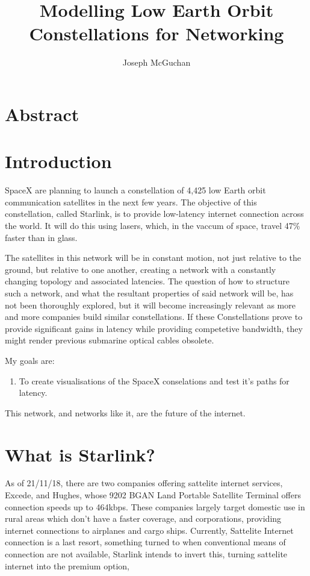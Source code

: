 \documentclass[12pt]{article}
\begin{document}
\title{Modelling Low Earth Orbit Constellations for Networking}
\author{Joseph McGuchan}
\maketitle
\thispagestyle{empty}

\section{Abstract}


\section{Introduction}

SpaceX are planning to launch a constellation of 4,425 low Earth orbit communication satellites in the next few years. The objective of this constellation, called Starlink, is to provide low-latency internet connection across the world. It will do this using lasers, which, in the vaccum of space, travel 47\% faster than in glass.

The satellites in this network will be in constant motion, not just relative to the ground, but relative to one another, creating a network with a constantly changing topology and associated latencies. The question of how to structure such a network, and what the resultant properties of said network will be, has not been thoroughly explored, but it will become increasingly relevant as more and more companies build similar constellations. If these Constellations prove to provide significant gains in latency while providing competetive bandwidth, they might render previous submarine optical cables obsolete.

My goals are:
\begin{enumerate}
	\item To create visualisations of the SpaceX conselations and test it's paths for latency.
\end{enumerate}

This network, and networks like it, are the future of the internet.


\section{What is Starlink?}


As of 21/11/18, there are two companies offering sattelite internet services, Excede\cite{ExcedeWebsite}, and Hughes, whose 9202 BGAN Land Portable Satellite Terminal offers connection speeds up to 464kbps\cite{HughesWebsite}. These companies largely target domestic use in rural areas which don’t have a faster coverage, and corporations, providing internet connections to airplanes and cargo ships. Currently, Sattelite Internet connection is a last resort, something turned to when conventional means of connection are not available, Starlink intends to invert this, turning sattelite internet into the premium option, 
\end{document}
